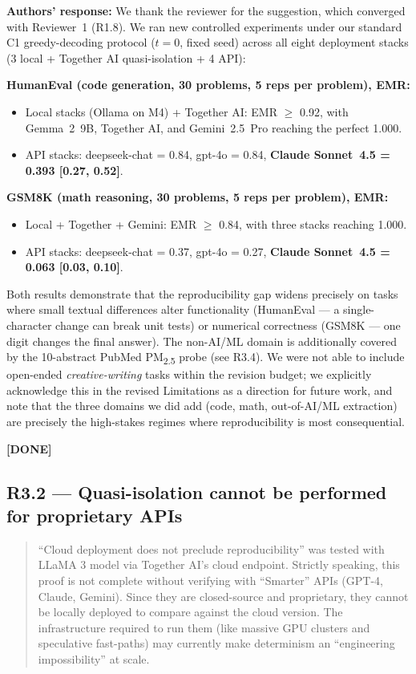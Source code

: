 \documentclass[11pt,a4paper]{article}
\newenvironment{revquote}{%
  \begin{quote}\small\itshape\color{revgray}
}{%
  \end{quote}
}
\newcommand{\response}[1]{\par\noindent\textbf{\color{revgreen}Authors' response:} #1\par}
\newcommand{\done}{\color{revgreen}\textbf{[DONE]}}
\begin{document}
\response{We thank the reviewer for the suggestion, which converged with Reviewer~1 (R1.8). We ran new controlled experiments under our standard C1 greedy-decoding protocol ($t{=}0$, fixed seed) across all eight deployment stacks (3 local + Together AI quasi-isolation + 4 API):

\textbf{HumanEval (code generation, 30 problems, 5 reps per problem), EMR:}
\begin{itemize}[leftmargin=*]
  \item Local stacks (Ollama on M4) + Together AI: EMR $\geq$ 0.92, with Gemma~2~9B, Together AI, and Gemini~2.5~Pro reaching the perfect 1.000.
  \item API stacks: deepseek-chat = 0.84, gpt-4o = 0.84, \textbf{Claude Sonnet~4.5 = 0.393 [0.27, 0.52]}.
\end{itemize}

\textbf{GSM8K (math reasoning, 30 problems, 5 reps per problem), EMR:}
\begin{itemize}[leftmargin=*]
  \item Local + Together + Gemini: EMR $\geq$ 0.84, with three stacks reaching 1.000.
  \item API stacks: deepseek-chat = 0.37, gpt-4o = 0.27, \textbf{Claude Sonnet~4.5 = 0.063 [0.03, 0.10]}.
\end{itemize}

Both results demonstrate that the reproducibility gap widens precisely on tasks where small textual differences alter functionality (HumanEval --- a single-character change can break unit tests) or numerical correctness (GSM8K --- one digit changes the final answer). The non-AI/ML domain is additionally covered by the 10-abstract PubMed PM\textsubscript{2.5} probe (see R3.4). We were not able to include open-ended \emph{creative-writing} tasks within the revision budget; we explicitly acknowledge this in the revised Limitations as a direction for future work, and note that the three domains we did add (code, math, out-of-AI/ML extraction) are precisely the high-stakes regimes where reproducibility is most consequential.} \done

\subsection*{R3.2 --- Quasi-isolation cannot be performed for proprietary APIs}

\begin{revquote}
``Cloud deployment does not preclude reproducibility'' was tested with LLaMA 3 model via Together AI's cloud endpoint. Strictly speaking, this proof is not complete without verifying with ``Smarter'' APIs (GPT-4, Claude, Gemini). Since they are closed-source and proprietary, they cannot be locally deployed to compare against the cloud version. The infrastructure required to run them (like massive GPU clusters and speculative fast-paths) may currently make determinism an ``engineering impossibility'' at scale.
\end{revquote}
\end{document}
